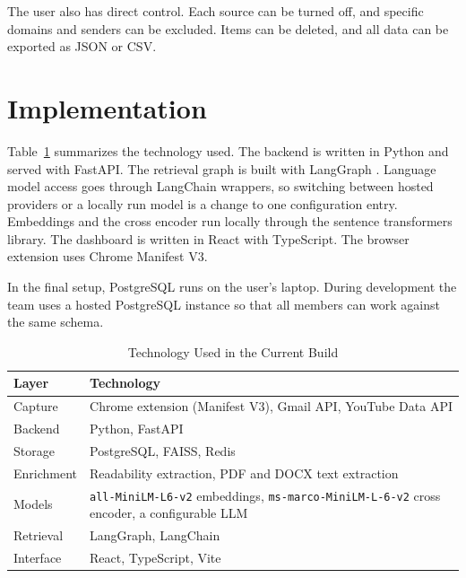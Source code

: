 \documentclass[conference]{IEEEtran}
\begin{document}
The user also has direct control. Each source can be turned off, and specific domains and senders can be excluded. Items can be deleted, and all data can be exported as JSON or CSV.

\section{Implementation}\label{sec:impl}
Table~\ref{tab:stack} summarizes the technology used. The backend is written in Python and served with FastAPI. The retrieval graph is built with LangGraph \cite{b5}. Language model access goes through LangChain wrappers, so switching between hosted providers or a locally run model is a change to one configuration entry. Embeddings and the cross encoder run locally through the sentence transformers library. The dashboard is written in React with TypeScript. The browser extension uses Chrome Manifest V3.

In the final setup, PostgreSQL runs on the user's laptop. During development the team uses a hosted PostgreSQL instance so that all members can work against the same schema.

\begin{table}[t]
\caption{Technology Used in the Current Build}
\label{tab:stack}
\centering
\renewcommand{\arraystretch}{1.15}
\begin{tabular}{|>{\raggedright\arraybackslash}p{2.0cm}|>{\raggedright\arraybackslash}p{5.55cm}|}
\hline
\textbf{Layer} & \textbf{Technology} \\
\hline
Capture & Chrome extension (Manifest V3), Gmail API, YouTube Data API \\
\hline
Backend & Python, FastAPI \\
\hline
Storage & PostgreSQL, FAISS, Redis \\
\hline
Enrichment & Readability extraction, PDF and DOCX text extraction \\
\hline
Models & \texttt{all-MiniLM-L6-v2} embeddings, \texttt{ms-marco-MiniLM-L-6-v2} cross encoder, a configurable LLM \\
\hline
Retrieval & LangGraph, LangChain \\
\hline
Interface & React, TypeScript, Vite \\
\hline
\end{tabular}
\end{table}
\end{document}
